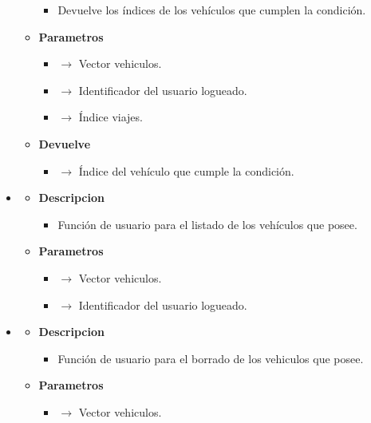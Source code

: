 \begin{itemize}
\begin{itemize}
\begin{itemize}
			\item Devuelve los índices de los vehículos que cumplen la condición.
		\end{itemize}
        \item \textbf{Parametros}
		\begin{itemize}
			\item {} $\rightarrow$ Vector vehiculos.
            \item {} $\rightarrow$ Identificador del usuario logueado.
            \item {} $\rightarrow$ Índice viajes.
		\end{itemize}
        \item \textbf{Devuelve}
		\begin{itemize}
			\item {} $\rightarrow$ Índice del vehículo que cumple la condición.
		\end{itemize}
	\end{itemize}
    \item{}
	\begin{itemize}
		\item \textbf{Descripcion}
        \begin{itemize}
			\item Función de usuario para el listado de los vehículos que posee.
		\end{itemize}
        \item \textbf{Parametros}
		\begin{itemize}
			\item {} $\rightarrow$ Vector vehiculos.
            \item {} $\rightarrow$ Identificador del usuario logueado.
		\end{itemize}
	\end{itemize}
    \newpage
    \item{}
	\begin{itemize}
		\item \textbf{Descripcion}
        \begin{itemize}
			\item Función de usuario para el borrado de los vehiculos que posee.
		\end{itemize}
        \item \textbf{Parametros}
		\begin{itemize}
			\item {} $\rightarrow$ Vector vehiculos.

\end{itemize}
\end{itemize}
\end{itemize}
